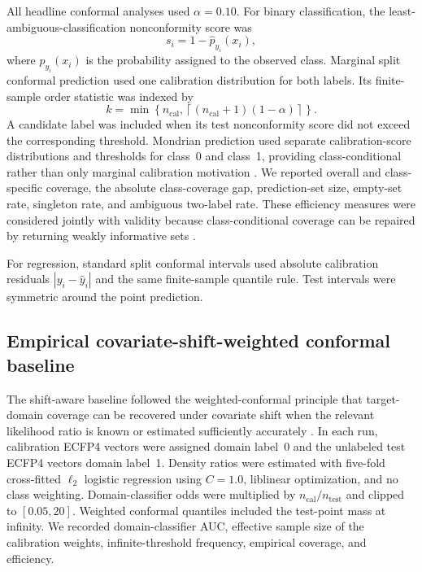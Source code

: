 All headline conformal analyses used $\alpha=0.10$. For binary classification, the least-ambiguous-classification nonconformity score was
\begin{equation}
  s_i = 1-\widehat{p}_{y_i}(x_i),
\end{equation}
where $\widehat{p}_{y_i}(x_i)$ is the probability assigned to the observed class. Marginal split conformal prediction used one calibration distribution for both labels. Its finite-sample order statistic was indexed by
\begin{equation}
  k=\min\!\left\{n_{\mathrm{cal}},\left\lceil(n_{\mathrm{cal}}+1)(1-\alpha)\right\rceil\right\}.
\end{equation}
A candidate label was included when its test nonconformity score did not exceed the corresponding threshold. Mondrian prediction used separate calibration-score distributions and thresholds for class~0 and class~1, providing class-conditional rather than only marginal calibration motivation \citep{cauchois2021knowing,ding2023classconditional}. We reported overall and class-specific coverage, the absolute class-coverage gap, prediction-set size, empty-set rate, singleton rate, and ambiguous two-label rate. These efficiency measures were considered jointly with validity because class-conditional coverage can be repaired by returning weakly informative sets \citep{krstajic2021critical,fisch2022trading}.

For regression, standard split conformal intervals used absolute calibration residuals $|y_i-\widehat{y}_i|$ and the same finite-sample quantile rule. Test intervals were symmetric around the point prediction.

\subsection{Empirical covariate-shift-weighted conformal baseline}

The shift-aware baseline followed the weighted-conformal principle that target-domain coverage can be recovered under covariate shift when the relevant likelihood ratio is known or estimated sufficiently accurately \citep{tibshirani2019covariate}. In each run, calibration ECFP4 vectors were assigned domain label~0 and the unlabeled test ECFP4 vectors domain label~1. Density ratios were estimated with five-fold cross-fitted $\ell_2$ logistic regression using $C=1.0$, liblinear optimization, and no class weighting. Domain-classifier odds were multiplied by $n_{\mathrm{cal}}/n_{\mathrm{test}}$ and clipped to $[0.05,20]$. Weighted conformal quantiles included the test-point mass at infinity. We recorded domain-classifier AUC, effective sample size of the calibration weights, infinite-threshold frequency, empirical coverage, and efficiency.

